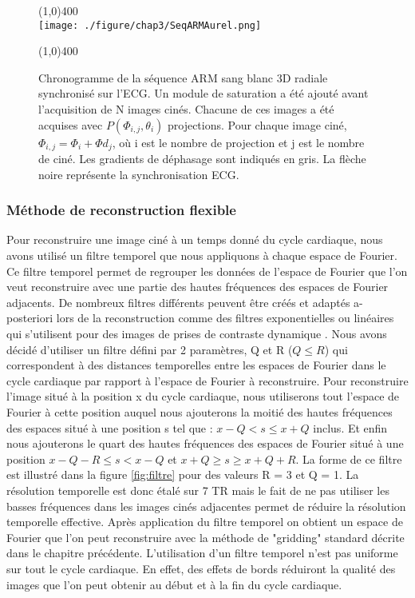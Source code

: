 \begin{figure}[H]
\centering \line(1,0){400} \\
\texttt{[image: ./figure/chap3/SeqARMAurel.png]}
\caption[Chronogramme ARM dynamique]{\label{fig:SeqARMAurel} Chronogramme de la séquence ARM sang blanc 3D radiale synchronisé sur l'ECG. Un module de saturation a été ajouté avant l'acquisition de N images cinés. Chacune de ces images a été acquises avec $P(\Phi_{i,j},\theta_i)$ projections. Pour chaque image ciné, $\Phi_{i,j} = \Phi_i+\Phi d_j$, où i est le nombre de projection et j est le nombre de ciné. Les gradients de déphasage sont indiqués en gris. La flèche noire représente la synchronisation ECG.}
\line(1,0){400} \\ \end{figure}

\subsubsection{Méthode de reconstruction flexible}

Pour reconstruire une image ciné à un temps donné du cycle cardiaque, nous avons utilisé un filtre temporel que nous appliquons à chaque espace de Fourier. Ce filtre temporel permet de regrouper les données de l'espace de Fourier que l'on veut reconstruire avec une partie des hautes fréquences des espaces de Fourier adjacents. De nombreux filtres différents peuvent être créés et adaptés a-posteriori lors de la reconstruction comme des filtres exponentielles ou linéaires qui s'utilisent pour des images de prises de contraste dynamique \cite{Lin:2008uq}.
Nous avons décidé d'utiliser un filtre défini par 2 paramètres, Q et R ($Q \leq R$) qui correspondent à des distances temporelles entre les espaces de Fourier dans le cycle cardiaque par rapport à l'espace de Fourier à reconstruire. Pour reconstruire l'image situé à la position x du cycle cardiaque, nous utiliserons tout l'espace de Fourier à cette position auquel nous ajouterons la moitié des hautes fréquences des espaces situé à une position s tel que : $x-Q < s \leq x+Q$ inclus. Et enfin nous ajouterons le quart des hautes fréquences des espaces de Fourier situé à une position $x-Q-R \leq s < x-Q$ et $x+Q \geq s \geq x+Q+R$. La forme de ce filtre est illustré dans la figure \ref{fig:filtre} pour des valeurs R = 3 et Q = 1.
La résolution temporelle est donc étalé sur 7 TR mais le fait de ne pas utiliser les basses fréquences dans les images cinés adjacentes permet de réduire la résolution temporelle effective.
Après application du filtre temporel on obtient un espace de Fourier que l'on peut reconstruire avec la méthode de "gridding" standard décrite dans le chapitre précédente.
L'utilisation d'un filtre temporel n'est pas uniforme sur tout le cycle cardiaque. En effet, des effets de bords réduiront la qualité des images que l'on peut obtenir au début et à la fin du cycle cardiaque.


